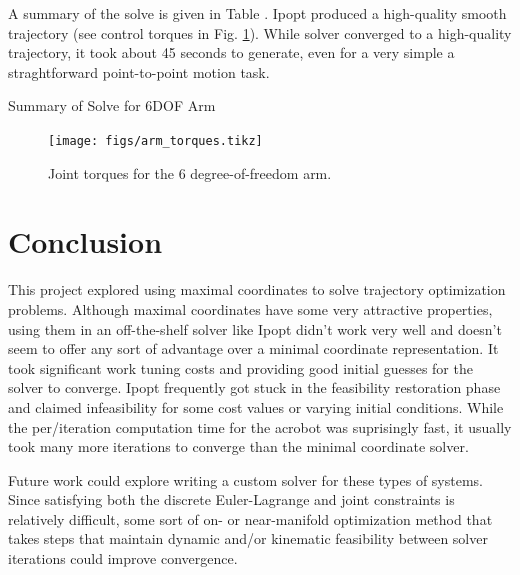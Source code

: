 \documentclass[conference]{IEEEtran}
\begin{document}
A summary of the solve is given in Table \label{tab:arm}. Ipopt produced a high-quality
smooth trajectory (see control torques in Fig. \ref{fig:arm_torques}). While solver converged
to a high-quality trajectory, it took about 45 seconds to generate, even for a very simple 
a straghtforward point-to-point motion task. 

\begin{table}
    \centering 
    \caption{Summary of Solve for 6DOF Arm}
    
    \label{tab:arm}
\end{table}

\begin{figure}
    \centering
    \texttt{[image: figs/arm\_torques.tikz]}
    \caption{Joint torques for the 6 degree-of-freedom arm.}
    \label{fig:arm_torques}
\end{figure}

\section{Conclusion}
This project explored using maximal coordinates to solve trajectory optimization problems.
Although maximal coordinates have some very attractive properties, using them in an 
off-the-shelf solver like Ipopt didn't work very well and doesn't seem to offer any sort of 
advantage over a minimal coordinate representation. It took significant work tuning costs
and providing good initial guesses for the solver to converge. Ipopt frequently got stuck 
in the feasibility restoration phase and claimed infeasibility for some cost values or 
varying initial conditions. While the per/iteration computation time for the acrobot was 
suprisingly fast, it usually took many more iterations to converge than the minimal 
coordinate solver. 

Future work could explore writing a custom solver for these types of systems. Since 
satisfying both the discrete Euler-Lagrange and joint constraints is relatively difficult,
some sort of on- or near-manifold optimization method that takes steps that maintain 
dynamic and/or kinematic feasibility between solver iterations could improve convergence.


\printbibliography
\end{document}
